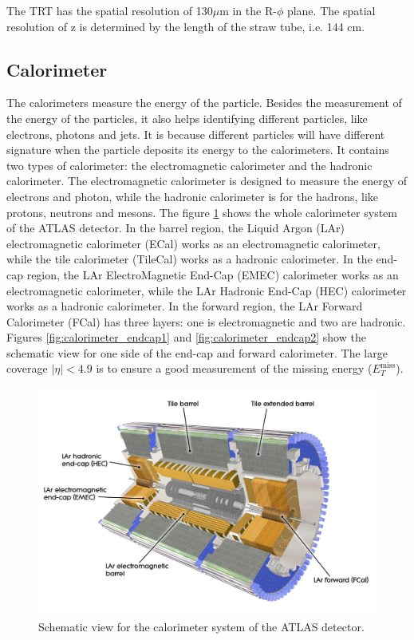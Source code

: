 The TRT has the spatial resolution of 130$\mu$m in the R-$\phi$ plane.
The spatial resolution of z is determined by the length of the straw tube, i.e. 144 cm.

\subsection{Calorimeter}
The calorimeters measure the energy of the particle.
Besides the measurement of the energy of the particles, it also helps identifying different particles, like electrons, photons and jets.
It is because different particles will have different signature when the particle deposits its energy to the calorimeters.
It contains two types of calorimeter: the electromagnetic calorimeter and the hadronic calorimeter.
The electromagnetic calorimeter is designed to measure the energy of electrons and photon, while the hadronic calorimeter is for the hadrons, like protons, neutrons and mesons.
The figure \ref{fig:calorimeter_whole} shows the whole calorimeter system of the ATLAS detector.
In the barrel region, the Liquid Argon (LAr) electromagnetic calorimeter (ECal) works as an electromagnetic calorimeter, while the tile calorimeter (TileCal) works as a hadronic calorimeter.
In the end-cap region, the LAr ElectroMagnetic End-Cap (EMEC) calorimeter works as an electromagnetic calorimeter, while the LAr Hadronic End-Cap (HEC) calorimeter works as a hadronic calorimeter.
In the forward region, the LAr Forward Calorimeter (FCal) has three layers: one is electromagnetic and two are hadronic.
Figures \ref{fig:calorimeter_endcap1} and \ref{fig:calorimeter_endcap2} show the schematic view for one side of the end-cap and forward calorimeter.
The large coverage $|\eta| < 4.9$ is to ensure a good measurement of the missing energy ($E_T^{\text{miss}}$).

\begin{figure}
\centering
\includegraphics[width=\textwidth]{data/photo/detector/calorimeter_whole.jpg}
\caption{Schematic view for the calorimeter system of the ATLAS detector. \cite{calorimeter_whole}}
\label{fig:calorimeter_whole}
\end{figure}

